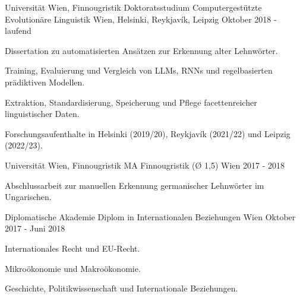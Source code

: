 

\begin{cventries}

  \cventry
    {Universität Wien, Finnougristik} %
    {Doktoratsstudium Computergestützte Evolutionäre Linguistik} %
    {Wien, Helsinki, Reykjavík, Leipzig} %
    {Oktober 2018 - laufend} %
    {
      \begin{cvitems} %
        \item{Dissertation zu automatisierten Ansätzen zur Erkennung alter Lehnwörter.}
        \item{Training, Evaluierung und Vergleich von LLMs, RNNs und regelbasierten prädiktiven Modellen.}
        \item{Extraktion, Standardisierung, Speicherung und Pflege facettenreicher linguistischer Daten.}
        \item{Forschungsaufenthalte in Helsinki (2019/20), Reykjavík (2021/22) und Leipzig (2022/23).}
      \end{cvitems}
    }

  \cventry
    {Universität Wien, Finnougristik} %
    {MA Finnougristik (Ø 1,5)} %
    {Wien} %
    {2017 - 2018} %
    {
      \begin{cvitems} %
        \item {Abschlussarbeit zur manuellen Erkennung germanischer Lehnwörter im Ungarischen.}
      \end{cvitems}
    }

  \cventry
    {Diplomatische Akademie} %
    {Diplom in Internationalen Beziehungen} %
    {Wien} %
    {Oktober 2017 - Juni 2018} %
    {
    \begin{cvitems} %
        \item{Internationales Recht und EU-Recht.}
        \item{Mikroökonomie und Makroökonomie.}
        \item{Geschichte, Politikwissenschaft und Internationale Beziehungen.}
      \end{cvitems}
    }
    

\end{cventries}
